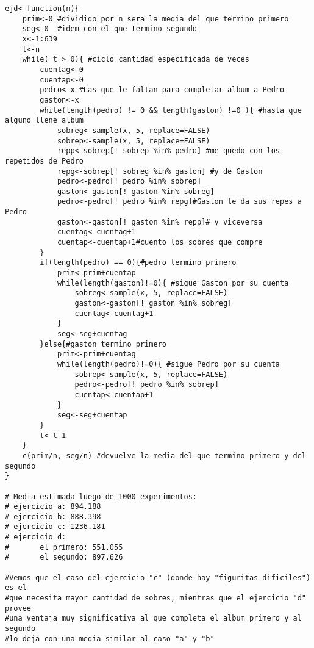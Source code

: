 \documentclass[a4paper,10pt]{article}
\begin{document}
\begin{lstlisting}
ejd<-function(n){
	prim<-0 #dividido por n sera la media del que termino primero
	seg<-0	#idem con el que termino segundo
	x<-1:639
	t<-n
	while( t > 0){ #ciclo cantidad especificada de veces
		cuentag<-0
		cuentap<-0
		pedro<-x #Las que le faltan para completar album a Pedro
		gaston<-x
		while(length(pedro) != 0 && length(gaston) !=0 ){ #hasta que alguno llene album
			sobreg<-sample(x, 5, replace=FALSE)
			sobrep<-sample(x, 5, replace=FALSE)
			repp<-sobrep[! sobrep %in% pedro] #me quedo con los repetidos de Pedro
			repg<-sobrep[! sobreg %in% gaston] #y de Gaston
			pedro<-pedro[! pedro %in% sobrep]
			gaston<-gaston[! gaston %in% sobreg]
			pedro<-pedro[! pedro %in% repg]#Gaston le da sus repes a Pedro
			gaston<-gaston[! gaston %in% repp]# y viceversa
			cuentag<-cuentag+1
			cuentap<-cuentap+1#cuento los sobres que compre			
		}
		if(length(pedro) == 0){#pedro termino primero
			prim<-prim+cuentap 
			while(length(gaston)!=0){ #sigue Gaston por su cuenta
				sobreg<-sample(x, 5, replace=FALSE)
				gaston<-gaston[! gaston %in% sobreg]
				cuentag<-cuentag+1
			}
			seg<-seg+cuentag
		}else{#gaston termino primero
			prim<-prim+cuentag
			while(length(pedro)!=0){ #sigue Pedro por su cuenta
				sobrep<-sample(x, 5, replace=FALSE)
				pedro<-pedro[! pedro %in% sobrep]
				cuentap<-cuentap+1
			}
			seg<-seg+cuentap
		}
		t<-t-1
	}
	c(prim/n, seg/n) #devuelve la media del que termino primero y del segundo
}

# Media estimada luego de 1000 experimentos:
# ejercicio a: 894.188
# ejercicio b: 888.398
# ejercicio c: 1236.181
# ejercicio d: 
#		el primero: 551.055
#		el segundo: 897.626

#Vemos que el caso del ejercicio "c" (donde hay "figuritas dificiles") es el
#que necesita mayor cantidad de sobres, mientras que el ejercicio "d" provee
#una ventaja muy significativa al que completa el album primero y al segundo 
#lo deja con una media similar al caso "a" y "b"

\end{lstlisting}
\end{document}
